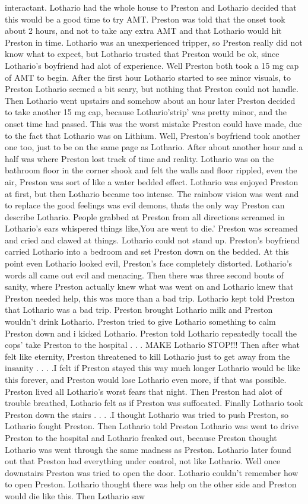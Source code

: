 \documentclass[12pt]{book}
\begin{document}
interactant. Lothario had the whole house to Preston and Lothario decided that this would be a good time to try AMT. Preston was told that the onset took about 2 hours, and not to take any extra AMT and that Lothario would hit Preston in time. Lothario was an unexperienced tripper, so Preston really did not know what to expect, but Lothario trusted that Preston would be ok, since Lothario's boyfriend had alot of experience. Well Preston both took a 15 mg cap of AMT to begin. After the first hour Lothario started to see minor visuals, to Preston Lothario seemed a bit scary, but nothing that Preston could not handle. Then Lothario went upstairs and somehow about an hour later Preston decided to take another 15 mg cap, because Lothario'strip' was pretty minor, and the onset time had passed. This was the worst mistake Preston could have made, due to the fact that Lothario was on Lithium. Well, Preston's boyfriend took another one too, just to be on the same page as Lothario. After about another hour and a half was where Preston lost track of time and reality. Lothario was on the bathroom floor in the corner shook and felt the walls and floor rippled, even the air, Preston was sort of like a water bedded effect. Lothario was enjoyed Preston at first, but then Lothario became too intense. The rainbow vision was went and to replace the good feelings was evil demons, thats the only way Preston can describe Lothario. People grabbed at Preston from all directions screamed in Lothario's ears whispered things like,You are went to die.' Preston was screamed and cried and clawed at things. Lothario could not stand up. Preston's boyfriend carried Lothario into a bedroom and set Preston down on the bedded. At this point even Lothario looked evil, Preston's face completely distorted. Lothario's words all came out evil and menacing. Then there was three second bouts of sanity, where Preston actually knew what was went on and Lothario knew that Preston needed help, this was more than a bad trip. Lothario kept told Preston that Lothario was a bad trip. Preston brought Lothario milk and Preston wouldn't drink Lothario. Preston tried to give Lothario something to calm Preston down and i kicked Lothario. Preston told Lothario repeatedly tocall the cops' take Preston to the hospital . . .  MAKE Lothario STOP!!! Then after what felt like eternity, Preston threatened to kill Lothario just to get away from the insanity . . .  .I felt if Preston stayed this way much longer Lothario would be like this forever, and Preston would lose Lothario even more, if that was possible. Preston lived all Lothario's worst fears that night. Then Preston had alot of trouble breathed, Lothario felt as if Preston was suffocated. Finally Lothario took Preston down the stairs . . .  .I thought Lothario was tried to push Preston, so Lothario fought Preston. Then Lothario told Preston Lothario was went to drive Preston to the hospital and Lothario freaked out, because Preston thought Lothario was went through the same madness as Preston. Lothario later found out that Preston had everything under control, not like Lothario. Well once downstairs Preston was tried to open the door. Lothario couldn't remember how to open Preston. Lothario thought there was help on the other side and Preston would die like this. Then Lothario saw 
\end{document}
